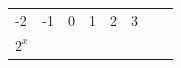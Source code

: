 {{\begin{center}
\begin{tabular}[t]{|l|l|l|l|l|l|l|l|}
    
        -2 &
    
    
        -1 &
    
    
        0 &
    
    
        1 &
    
    
        2 &
    
    
        3%
     \tabularnewline\cline{1-1}\cline{2-2}\cline{3-3}\cline{4-4}\cline{5-5}\cline{6-6}\cline{7-7}\cline{8-8}
    
    
        
                \begin{math}{2}^{x}\end{math}
               &
    
    
         &
    

\end{tabular}
\end{center}}}
